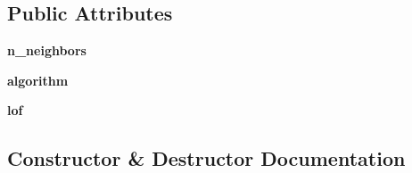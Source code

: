 \subsection*{Public Attributes}
\begin{DoxyCompactItemize}
\item 
{\bfseries n\+\_\+neighbors}\hypertarget{classSAD_1_1Point__AnomalyDetector_1_1LOFAnomalyScorer_1_1LOFAnomalyScorer_a25f6111d8c73e8e3dcac7009a27cf762}{}\label{classSAD_1_1Point__AnomalyDetector_1_1LOFAnomalyScorer_1_1LOFAnomalyScorer_a25f6111d8c73e8e3dcac7009a27cf762}

\item 
{\bfseries algorithm}\hypertarget{classSAD_1_1Point__AnomalyDetector_1_1LOFAnomalyScorer_1_1LOFAnomalyScorer_a60c856f4087c27a2048e1afe93f96193}{}\label{classSAD_1_1Point__AnomalyDetector_1_1LOFAnomalyScorer_1_1LOFAnomalyScorer_a60c856f4087c27a2048e1afe93f96193}

\item 
{\bfseries lof}\hypertarget{classSAD_1_1Point__AnomalyDetector_1_1LOFAnomalyScorer_1_1LOFAnomalyScorer_ac335b7ec6d13003eec655ba754c55921}{}\label{classSAD_1_1Point__AnomalyDetector_1_1LOFAnomalyScorer_1_1LOFAnomalyScorer_ac335b7ec6d13003eec655ba754c55921}

\end{DoxyCompactItemize}


\subsection{Constructor \& Destructor Documentation}
